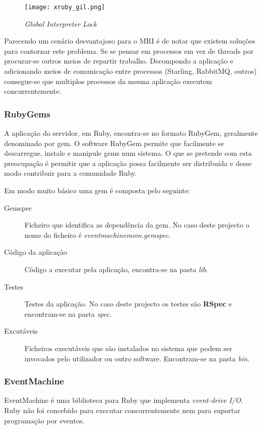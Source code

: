 \begin{figure}[H]
\centering
\texttt{[image: xruby\_gil.png]}
\caption{\textit{Global Interpreter Lock}}
\label{fig:ruby-gil}
\end{figure}

Parecendo um cenário desvantajoso para o MRI é de notar que existem soluções para contornar este problema. Se se pensar em processos em vez de threads por procurar-se outros meios de repartir trabalho. Decompondo a aplicação e adicionando meios de comunicação entre processos (Starling, RabbitMQ, outros) consegue-se que multiplos processos da mesma aplicação executem concurrentemente.

\subsubsection{RubyGems}

A aplicação do servidor, em Ruby, encontra-se no formato RubyGem, geralmente denominado por gem. O software RubyGem permite que facilmente se descarregue, instale e manipule gems num sistema.\cite{rubygems} O que se pretende com esta preocupação é permitir que a aplicação possa facilmente ser distribuída e desse modo contribuir para a comunidade Ruby.

Em modo muito básico uma gem é composta pelo seguinte:

\begin{description}
\item[Gemspec] Ficheiro que identifica as dependência da gem. No caso deste projecto o nome do ficheiro é \textit{eventmachinemom.gemspec}.
\item[Código da aplicação] Código a executar pela aplicação, encontra-se na pasta \textit{lib}.
\item[Testes] Testes da aplicação. No caso deste projecto os testes são \textbf{RSpec} e encontram-se na pasta \textit{spec}.
\item[Excutáveis] Ficheiros executáveis que são instalados no sistema que podem ser invocados pelo utilizador ou outro software. Encontram-se na pasta \textit{bin}.
\end{description}

\subsubsection{EventMachine}

EventMachine é uma biblioteca para Ruby que implementa \textit{event-drive I/O}. Ruby não foi concebido para executar concorrentemente nem para suportar programação por eventos.




